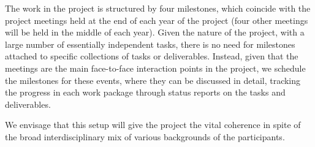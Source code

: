 
The work in the \TheProject project is structured by four milestones,
which coincide with the project meetings held at the end of each
year of the project (four other meetings will be held in the middle
of each year). Given the nature of the project, with a
large number of essentially independent tasks, there is no need for
milestones attached to specific collections of tasks or
deliverables. Instead, given that the meetings are the main
face-to-face interaction points in the project, we
schedule the milestones for these events, where they can be discussed
in detail, tracking the progress in each work package through status
reports on the tasks and deliverables.

We envisage that this setup will give the project the vital coherence
in spite of the broad interdisciplinary mix of various backgrounds of the
participants.



